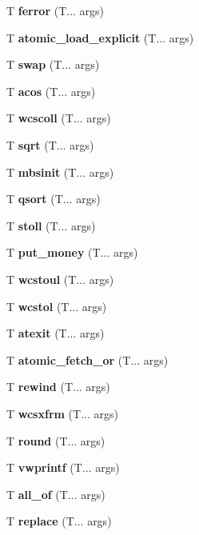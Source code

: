 \begin{DoxyCompactItemize}
\item 
\mbox{\label{ferror}} 
T \textbf{ ferror} (T... args)
\item 
\mbox{\label{atomic_load}} 
T \textbf{ atomic\+\_\+load\+\_\+explicit} (T... args)
\item 
\mbox{\label{swap}} 
T \textbf{ swap} (T... args)
\item 
\mbox{\label{acos}} 
T \textbf{ acos} (T... args)
\item 
\mbox{\label{wcscoll}} 
T \textbf{ wcscoll} (T... args)
\item 
\mbox{\label{sqrt}} 
T \textbf{ sqrt} (T... args)
\item 
\mbox{\label{mbsinit}} 
T \textbf{ mbsinit} (T... args)
\item 
\mbox{\label{qsort}} 
T \textbf{ qsort} (T... args)
\item 
\mbox{\label{stol}} 
T \textbf{ stoll} (T... args)
\item 
\mbox{\label{put_money}} 
T \textbf{ put\+\_\+money} (T... args)
\item 
\mbox{\label{wcstoul}} 
T \textbf{ wcstoul} (T... args)
\item 
\mbox{\label{wcstol}} 
T \textbf{ wcstol} (T... args)
\item 
\mbox{\label{atexit}} 
T \textbf{ atexit} (T... args)
\item 
\mbox{\label{atomic_fetch_or}} 
T \textbf{ atomic\+\_\+fetch\+\_\+or} (T... args)
\item 
\mbox{\label{rewind}} 
T \textbf{ rewind} (T... args)
\item 
\mbox{\label{wcsxfrm}} 
T \textbf{ wcsxfrm} (T... args)
\item 
\mbox{\label{round}} 
T \textbf{ round} (T... args)
\item 
\mbox{\label{vfwprintf}} 
T \textbf{ vwprintf} (T... args)
\item 
\mbox{\label{all_any_none_of}} 
T \textbf{ all\+\_\+of} (T... args)
\item 
\mbox{\label{replace}} 
T \textbf{ replace} (T... args)
\item 
\mbox{\label{remquo}} 

\end{DoxyCompactItemize}
